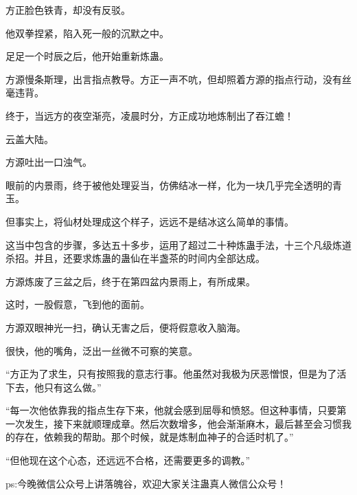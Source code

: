 \begin{this_body}
方正脸色铁青，却没有反驳。

他双拳捏紧，陷入死一般的沉默之中。

足足一个时辰之后，他开始重新炼蛊。

方源慢条斯理，出言指点教导。方正一声不吭，但却照着方源的指点行动，没有丝毫违背。

终于，当远方的夜空渐亮，凌晨时分，方正成功地炼制出了吞江蟾！

云盖大陆。

方源吐出一口浊气。

眼前的内景雨，终于被他处理妥当，仿佛结冰一样，化为一块几乎完全透明的青玉。

但事实上，将仙材处理成这个样子，远远不是结冰这么简单的事情。

这当中包含的步骤，多达五十多步，运用了超过二十种炼蛊手法，十三个凡级炼道杀招。并且，还要求炼蛊的蛊仙在半盏茶的时间内全部达成。

方源炼废了三盆之后，终于在第四盆内景雨上，有所成果。

这时，一股假意，飞到他的面前。

方源双眼神光一扫，确认无害之后，便将假意收入脑海。

很快，他的嘴角，泛出一丝微不可察的笑意。

“方正为了求生，只有按照我的意志行事。他虽然对我极为厌恶憎恨，但是为了活下去，他只有这么做。”

“每一次他依靠我的指点生存下来，他就会感到屈辱和愤怒。但这种事情，只要第一次发生，接下来就顺理成章。然后次数增多，他会渐渐麻木，最后甚至会习惯我的存在，依赖我的帮助。那个时候，就是炼制血神子的合适时机了。”

“但他现在这个心态，还远远不合格，还需要更多的调教。”

ps:今晚微信公众号上讲落魄谷，欢迎大家关注蛊真人微信公众号！

\end{this_body}

